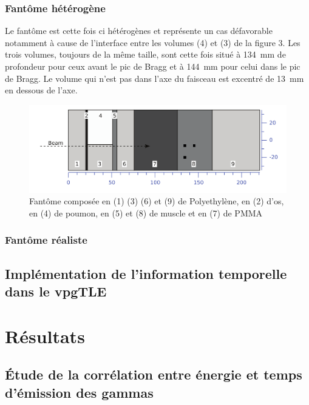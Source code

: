 \documentclass[11pt,a4paper,oldfontcommands]{memoir}
\begin{document}
\openany
\subsubsection{Fantôme hétérogène}

Le fantôme est cette fois ci hétérogènes et représente un cas défavorable notamment à cause de l'interface entre les volumes (4) et (3) de la figure 3. Les trois volumes, toujours de la même taille, sont cette fois situé à 134~mm de profondeur pour ceux avant le pic de Bragg et à 144~mm pour celui dans le pic de Bragg. Le volume qui n'est pas dans l'axe du faisceau est excentré de 13~mm en dessous de l'axe. 

\begin{figure}[h]
    \centering
    \includegraphics[scale = 0.3]{Parodi/heterofant.png}
    \caption{Fantôme composée en (1) (3) (6) et (9) de Polyethylène, en (2) d'os, en (4) de poumon, en (5) et (8) de muscle et en (7) de PMMA}
    \label{hetero phant}
\end{figure}{}

\subsubsection{Fantôme réaliste}

\subsection{Implémentation de l'information temporelle dans le vpgTLE}


\section{Résultats}

\subsection{\'Etude de la corrélation entre énergie et temps d'émission des gammas}
\end{document}
